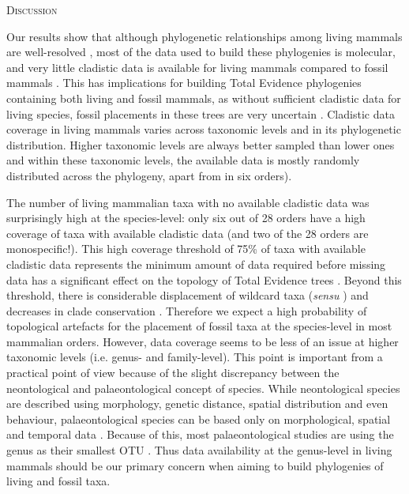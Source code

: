 \documentclass[12pt,letterpaper]{article}
\renewcommand{\section}[1]{%
\bigskip
\begin{center}
\begin{Large}
\normalfont\scshape #1
\medskip
\end{Large}
\end{center}}
\begin{document}
\section{Discussion}
Our results show that although phylogenetic relationships among living mammals are well-resolved \citep[e.g.][]{FritzTree,meredithimpacts2011,May-Collado-PeerJ} %
, most of the data used to build these phylogenies is molecular, and very little cladistic data is available for living mammals compared to fossil mammals \citep[e.g.][]{O'Leary08022013,ni2013oldest}.
This has implications for building Total Evidence phylogenies containing both living and fossil mammals, as without sufficient cladistic data for living species, fossil placements in these trees are very uncertain \citep{GuillermeCooper}.
Cladistic data coverage in living mammals varies across taxonomic levels and in its phylogenetic distribution.
Higher taxonomic levels are always better sampled than lower ones and within these taxonomic levels, the available data is mostly randomly distributed across the phylogeny, apart from in six orders).

The number of living mammalian taxa with no available cladistic data was surprisingly high at the species-level: only six out of 28 orders have a high coverage of taxa with available cladistic data (and two of the 28 orders are monospecific!).
This high coverage threshold of 75\% of taxa with available cladistic data represents the minimum amount of data required before missing data has a significant effect on the topology of Total Evidence trees \citep{GuillermeCooper}.
Beyond this threshold, there is considerable displacement of wildcard taxa (\textit{sensu} \citep{kearneyfragmentary2002}) and decreases in clade conservation \citep{GuillermeCooper}.
Therefore we expect a high probability of topological artefacts for the placement of fossil taxa at the species-level in most mammalian orders.
However, data coverage seems to be less of an issue at higher taxonomic levels (i.e. genus- and family-level).
This point is important from a practical point of view because of the slight discrepancy between the neontological and palaeontological concept of species.
While neontological species are described using morphology, genetic distance, spatial distribution and even behaviour, palaeontological species can be based only on morphological, spatial and temporal data \citep[e.g.][]{ni2013oldest}.
Because of this, most palaeontological studies are using the genus as their smallest OTU \citep[e.g.][]{ni2013oldest,O'Leary08022013}.
Thus data availability at the genus-level in living mammals should be our primary concern when aiming to build phylogenies of living and fossil taxa.
\end{document}

